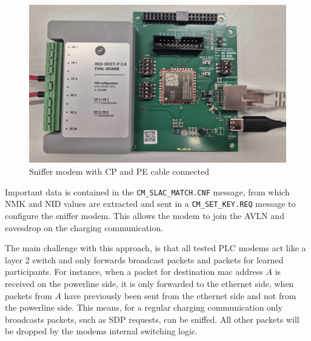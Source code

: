 \documentclass[sigconf]{acmart}
\begin{document}
\begin{figure}[ht]
    \centering
    \includegraphics[width=1\linewidth]{graphics/RedBeet-EV.jpg}
    \caption{Sniffer modem with CP and PE cable connected}
    \label{fig:redbeet}
\end{figure}

Important data is contained in the \texttt{CM\_SLAC\_MATCH.CNF} message, from which NMK and NID values are extracted and sent in a \texttt{CM\_SET\_KEY.REQ} message to configure the sniffer modem. This allows the modem to join the AVLN and eavesdrop on the charging communication.


The main challenge with this approach, is that all tested PLC modems act like a layer 2 switch and only forwards broadcast packets and packets for learned participants. For instance, when a packet for destination mac address $A$ is received on the powerline side, it is only forwarded to the ethernet side, when packets from $A$ have previously been sent from the ethernet side and not from the powerline side.
This means, for a regular charging communication only broadcasts packets, such as SDP requests, can be sniffed. All other packets will be dropped by the modems internal switching logic.
\end{document}
